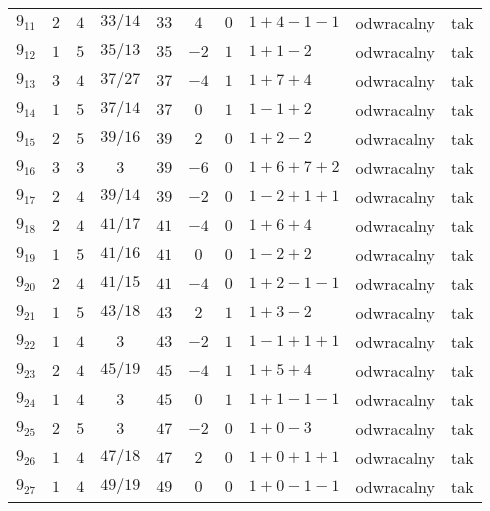 \begin{longtable}{lccccccllc}
$9_{11}$    &  $2$     &  $4$  &  $33/14$  &  $33$   &  $4$   &  $0$  &  $1+4-1-1$      &  odwracalny  &  tak  \\
$9_{12}$    &  $1$     &  $5$  &  $35/13$  &  $35$   &  $-2$  &  $1$  &  $1+1-2$        &  odwracalny  &  tak  \\
$9_{13}$    &  $3$     &  $4$  &  $37/27$  &  $37$   &  $-4$  &  $1$  &  $1+7+4$        &  odwracalny  &  tak  \\
$9_{14}$    &  $1$     &  $5$  &  $37/14$  &  $37$   &  $0$   &  $1$  &  $1-1+2$        &  odwracalny  &  tak  \\
$9_{15}$    &  $2$     &  $5$  &  $39/16$  &  $39$   &  $2$   &  $0$  &  $1+2-2$        &  odwracalny  &  tak  \\
$9_{16}$    &  $3$     &  $3$  &  $3$      &  $39$   &  $-6$  &  $0$  &  $1+6+7+2$      &  odwracalny  &  tak  \\
$9_{17}$    &  $2$     &  $4$  &  $39/14$  &  $39$   &  $-2$  &  $0$  &  $1-2+1+1$      &  odwracalny  &  tak  \\
$9_{18}$    &  $2$     &  $4$  &  $41/17$  &  $41$   &  $-4$  &  $0$  &  $1+6+4$        &  odwracalny  &  tak  \\
$9_{19}$    &  $1$     &  $5$  &  $41/16$  &  $41$   &  $0$   &  $0$  &  $1-2+2$        &  odwracalny  &  tak  \\
$9_{20}$    &  $2$     &  $4$  &  $41/15$  &  $41$   &  $-4$  &  $0$  &  $1+2-1-1$      &  odwracalny  &  tak  \\
$9_{21}$    &  $1$     &  $5$  &  $43/18$  &  $43$   &  $2$   &  $1$  &  $1+3-2$        &  odwracalny  &  tak  \\
$9_{22}$    &  $1$     &  $4$  &  $3$      &  $43$   &  $-2$  &  $1$  &  $1-1+1+1$      &  odwracalny  &  tak  \\
$9_{23}$    &  $2$     &  $4$  &  $45/19$  &  $45$   &  $-4$  &  $1$  &  $1+5+4$        &  odwracalny  &  tak  \\
$9_{24}$    &  $1$     &  $4$  &  $3$      &  $45$   &  $0$   &  $1$  &  $1+1-1-1$      &  odwracalny  &  tak  \\
$9_{25}$    &  $2$     &  $5$  &  $3$      &  $47$   &  $-2$  &  $0$  &  $1+0-3$        &  odwracalny  &  tak  \\
$9_{26}$    &  $1$     &  $4$  &  $47/18$  &  $47$   &  $2$   &  $0$  &  $1+0+1+1$      &  odwracalny  &  tak  \\
$9_{27}$    &  $1$     &  $4$  &  $49/19$  &  $49$   &  $0$   &  $0$  &  $1+0-1-1$      &  odwracalny  &  tak  \\

\end{longtable}
